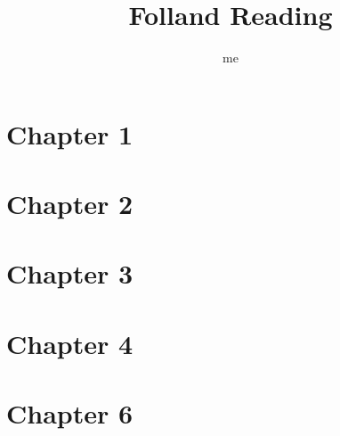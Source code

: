 \documentclass[12pt, oneside]{article}
\title{Folland Reading}
\author{me}
\begin{document}
\maketitle
\section{Chapter 1}
\section{Chapter 2}
\section{Chapter 3}


\section{Chapter 4}


















\section{Chapter 6}









\newpage
\end{document}

